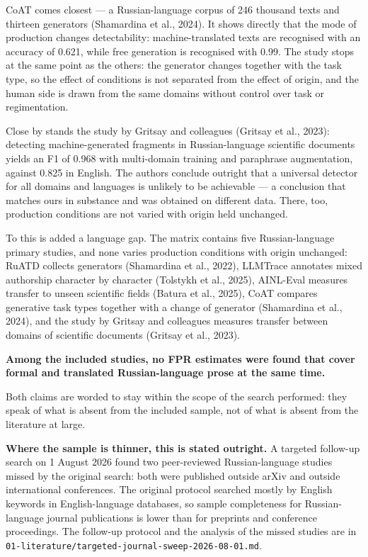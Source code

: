 \documentclass[11pt,a4paper]{article}
\renewcommand{\_}{\textunderscore\allowbreak}
\begin{document}
CoAT comes closest — a Russian-language corpus of 246 thousand texts and
thirteen generators (Shamardina et al., 2024). It shows directly that the mode of production changes
detectability: machine-translated texts are recognised with an accuracy of 0.621, while
free generation is recognised with 0.99. The study stops
at the same point as the others: the generator changes together with the task type,
so the effect of conditions is not separated from the effect of origin, and the human
side is drawn from the same domains without control over task or regimentation.

Close by stands the study by Gritsay and colleagues (Gritsay et al., 2023): detecting machine-generated fragments in
Russian-language scientific documents yields an F1 of 0.968 with multi-domain training and
paraphrase augmentation, against 0.825 in English. The authors conclude outright
that a universal detector for all domains and languages is unlikely to be achievable — a conclusion
that matches ours in substance and was obtained on different data. There, too, production
conditions are not varied with origin held unchanged.

To this is added a language gap. The matrix contains five Russian-language primary studies,
and none varies production conditions with origin unchanged: RuATD
collects generators (Shamardina et al., 2022), LLMTrace annotates mixed authorship character by character
(Tolstykh et al., 2025), AINL-Eval measures transfer to unseen scientific fields (Batura et al., 2025), CoAT
compares generative task types together with a change of generator (Shamardina et al., 2024), and the study
by Gritsay and colleagues measures transfer between domains of scientific documents (Gritsay et al., 2023).

\textbf{Among the included studies, no FPR estimates were found that cover
formal and translated Russian-language prose at the same time.}

Both claims are worded to stay within the scope of the search performed: they speak
of what is absent from the included sample, not of what is absent from the literature at large.

\textbf{Where the sample is thinner, this is stated outright.} A targeted follow-up search on 1 August 2026 found two
peer-reviewed Russian-language studies missed by the original search: both were published outside
arXiv and outside international conferences. The original protocol searched mostly by
English keywords in English-language databases, so sample completeness for
Russian-language journal publications is lower than for preprints and conference proceedings.
The follow-up protocol and the analysis of the missed studies are in \texttt{01-\allowbreak{}literature/targeted-\allowbreak{}journal-\allowbreak{}sweep-\allowbreak{}2026-\allowbreak{}08-\allowbreak{}01.md}.
\end{document}

